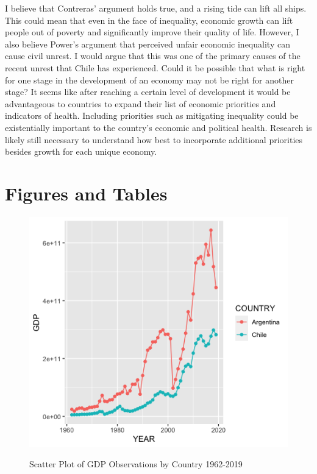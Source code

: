 \documentclass[12pt,english]{article}
\begin{document}
I believe that Contreras' argument holds true, and a rising tide can lift all ships. This could mean that even in the face of inequality, economic growth can lift people out of poverty and significantly improve their quality of life. However, I also believe Power's argument that perceived unfair economic inequality can cause civil unrest. I would argue that this was one of the primary causes of the recent unrest that Chile has experienced. Could it be possible that what is right for one stage in the development of an economy may not be right for another stage? It seems like after reaching a certain level of development it would be advantageous to countries to expand their list of economic priorities and indicators of health. Including priorities such as mitigating inequality could be existentially important to the country's economic and political health. Research is likely still necessary to understand how best to incorporate additional priorities besides growth for each unique economy. 

\vfill
\pagebreak{}
\begin{spacing}{1.0}


\end{spacing}

\vfill
\pagebreak{}
\clearpage

\section*{Figures and Tables}\label{sec:figTables}
\begin{figure}[ht]
\centering
\bigskip{}
\includegraphics{GDP Plot.png}
\caption{Scatter Plot of GDP Observations by Country 1962-2019}\citet{WB:2021}
\label{fig:fig1}
\end{figure}
\end{document}

